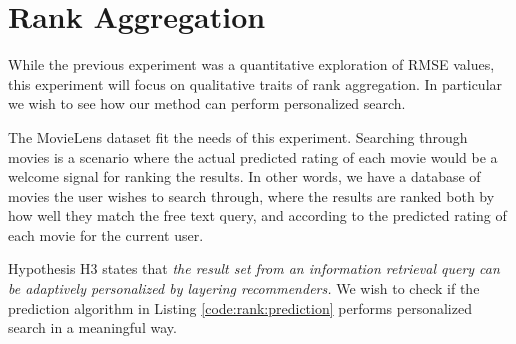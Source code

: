 \section{Rank Aggregation}


\afterpage{\clearpage}

While the previous experiment was a quantitative exploration of RMSE values,
this experiment will focus on qualitative traits of rank aggregation.
In particular we wish to see how our method can perform personalized search.

The MovieLens dataset fit the needs of this experiment.
Searching through movies is a scenario where the actual predicted
rating of each movie would be a welcome signal for ranking the results.
In other words, we have a database of movies the user wishes to search through,
where the results are ranked both by how well they match the free text query,
and according to the predicted rating of each movie for the current user.

Hypothesis H3 states that 
{
  \itshape
  the result set from an information retrieval query
  can be adaptively personalized by layering recommenders.
}
We wish to check if the prediction algorithm
in Listing \ref{code:rank:prediction} performs personalized search
in a meaningful way.

\begin{comment}
\begin{table}[b]
  \centering
  \begin{tabular*}{0.7\textwidth}{ l l l l }
    \toprule
      ~ & 
      \emph{query} &
      \emph{scores} &
      \emph{IR weight} \\
    \midrule
    
    1 &
    ["new york or washington"] &
    combined &
    $1.0$ \\

    2 &
    [star trek] &
    combined &
    $0.3$ \\

    3 &
    [paris] &
    ratings &
    $0.0$ \\

    4 &
    [1998] &
    ratings &
    $0.0$ \\

    \bottomrule 
  \end{tabular*}
  \caption[List of Ranking Experiments]{List of ranking tests in this section.}
  \label{table:experiments:rank}
\end{table}
\end{comment}

